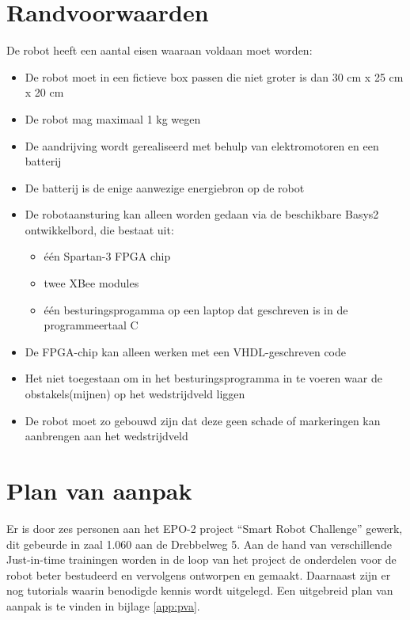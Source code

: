 \documentclass{report}
\begin{document}
\newpage
\section{Randvoorwaarden}

De robot heeft een aantal eisen waaraan voldaan moet worden:

\begin{itemize}

\item
De robot moet in een fictieve box passen die niet groter is dan 30 cm x 25 cm x 20 cm

\item
De robot mag maximaal 1 kg wegen

\item
De aandrijving wordt gerealiseerd met behulp van elektromotoren en een batterij

\item
De batterij is de enige aanwezige energiebron op de robot

\item
De robotaansturing kan alleen worden gedaan via de beschikbare Basys2 ontwikkelbord, die bestaat uit:

\begin{itemize}

\item
één Spartan-3 FPGA chip

\item
twee XBee modules

\item
één besturingsprogamma op een laptop dat geschreven is in de programmeertaal C


\end{itemize}

\item
De FPGA-chip kan alleen werken met een VHDL-geschreven code

\item
Het niet toegestaan om in het besturingsprogramma in te voeren waar de obstakels(mijnen) op het wedstrijdveld liggen 

\item
De robot moet zo gebouwd zijn dat deze geen schade of markeringen kan aanbrengen aan het wedstrijdveld

\end{itemize}

\section{Plan van aanpak}

Er is door zes personen aan het EPO-2 project ``Smart Robot Challenge'' gewerk, dit gebeurde in zaal 1.060 aan de Drebbelweg 5.
Aan de hand van verschillende Just-in-time trainingen worden in de loop van het project de onderdelen voor de robot beter bestudeerd en vervolgens ontworpen en gemaakt.
Daarnaast zijn er nog tutorials waarin benodigde kennis wordt uitgelegd.
Een uitgebreid plan van aanpak is te vinden in bijlage \ref{app:pva}.
\end{document}
